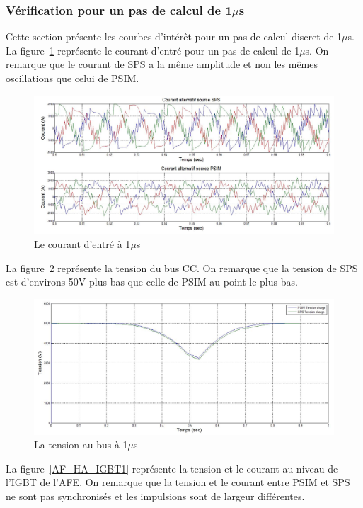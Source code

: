 \documentclass[11pt,letterpaper,final]{report}
\begin{document}
\clearpage
\subsubsection{Vérification pour un pas de calcul de 1$\mu$s}
Cette section présente les courbes d'intérêt pour un pas de calcul discret de 1$\mu$s. La figure~\ref{AF_HA_cou1} représente le courant d'entré pour un pas de calcul de 1$\mu$s. On remarque que le courant de SPS a la même amplitude et non les mêmes oscillations que celui de PSIM.


\begin{figure}[htb]
\centering
\includegraphics[scale=0.5]{Fig/Hach_AFE/1u/cour_al.jpg}
\caption{Le courant d'entré à 1$\mu$s}
\label{AF_HA_cou1}
\end{figure}

La figure~\ref{AF_HA_vch1} représente la tension du bus CC. On remarque que la tension de SPS est d'environs 50V plus bas que celle de PSIM au point le plus bas.

\begin{figure}[htb]
\centering
\includegraphics[scale=0.5]{Fig/Hach_AFE/1u/ten_bus.jpg}
\caption{La tension au bus à 1$\mu$s}
\label{AF_HA_vch1}
\end{figure}

La figure~\ref{AF_HA_IGBT1} représente la tension et le courant au niveau de l'IGBT de l'AFE. On remarque que la tension et le courant entre PSIM et SPS ne sont pas synchronisés et les impulsions sont de largeur différentes.
\end{document}
